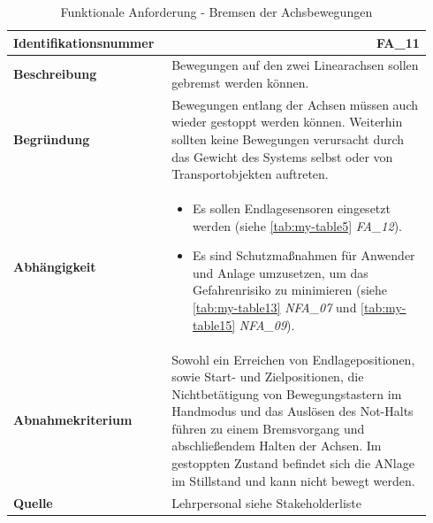 \documentclass[../../../Bachelorarbeit.tex]{subfiles}
\begin{document}
\begin{table}[H]
    \centering
    \begin{tabular}{ p{0.34\linewidth}  p{0.6\linewidth} }
        \hline
        \textbf{Identifikationsnummer}  & \multicolumn{1}{r}{FA\_11} \\ \hline
        \textbf{Beschreibung}           & Bewegungen auf den zwei Linearachsen sollen gebremst werden können. \\
        \textbf{Begründung}             & Bewegungen entlang der Achsen müssen auch wieder gestoppt werden können. Weiterhin sollten keine Bewegungen verursacht durch das Gewicht des Systems selbst oder von Transportobjekten auftreten. \\
        \textbf{Abhängigkeit}           &   {\begin{itemize}[noitemsep,topsep=0pt,parsep=0pt,partopsep=0pt,leftmargin=*]
                                                \item Es sollen Endlagesensoren eingesetzt werden (siehe \autoref{tab:my-table5} \textit{FA\_12}).
                                                \item Es sind Schutzmaßnahmen für Anwender und Anlage umzusetzen, um das Gefahrenrisiko zu minimieren (siehe \autoref{tab:my-table13} \textit{NFA\_07} und \autoref{tab:my-table15} \textit{NFA\_09}).
                                            \end{itemize}} \\
        \textbf{Abnahmekriterium}       & Sowohl ein Erreichen von Endlagepositionen, sowie Start- und Zielpositionen, die Nichtbetätigung von Bewegungstastern im Handmodus und das Auslösen des Not-Halts führen zu einem Bremsvorgang und abschließendem Halten der Achsen. Im gestoppten Zustand befindet sich die ANlage im Stillstand und kann nicht bewegt werden. \\
        \textbf{Quelle}                 & Lehrpersonal siehe Stakeholderliste \\ \hline
    \end{tabular}
    \caption[\acs{fa} - Bremsen der Achsbewegungen]{Funktionale Anforderung - Bremsen der Achsbewegungen}
    \label{tab:my-table4}
\end{table}
\end{document}
